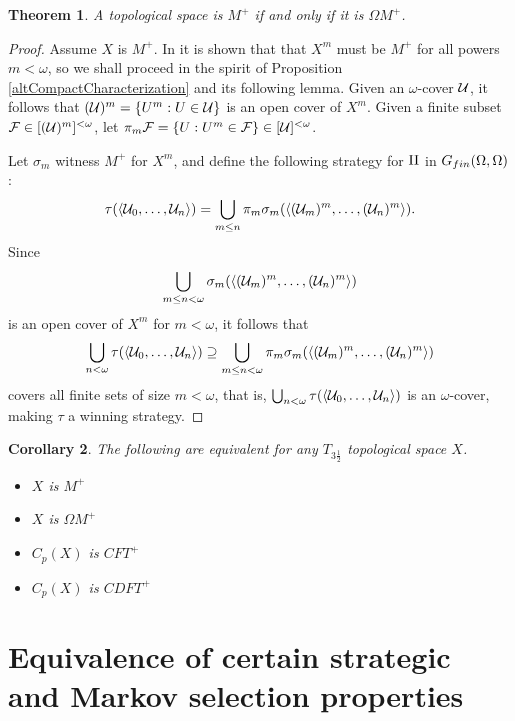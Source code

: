 \documentclass{amsart}
\theoremstyle{plain}
\newtheorem{theorem}{Theorem}
\newtheorem{corollary}[theorem]{Corollary}
\theoremstyle{definition}
\theoremstyle{remark}
\theoremstyle{plain}
\theoremstyle{definition}
\theoremstyle{remark}
\begin{document}
\begin{theorem}
  A topological space is \(M^+\) if and only if it is \(\Omega M^+\).
\end{theorem}

\begin{proof}
  Assume \(X\) is \(M^+\). In \cite[Proposition 5.1]{MR3383283} it is shown
  that that \(X^m\) must be \(M^+\) for all powers \(m<\omega\), so we shall
  proceed in the spirit of Proposition \ref{altCompactCharacterization}
  and its following lemma. Given an \(\omega\)-cover \(\mathcal{U}\),
  it follows that \((\mathcal{U})^m=\{U^m:U\in\mathcal{U}\}\) is an open cover of
  \(X^m\). Given a finite subset \(\mathcal{F}\in[(\mathcal{U})^m]^{<\omega}\),
  let \(\pi_m\mathcal{F}=\{U:U^m\in\mathcal{F}\}\in[\mathcal{U}]^{<\omega}\).

  Let \(\sigma_m\) witness \(M^+\) for \(X^m\), and define
  the following strategy for \(\mathrm{II}\) in \(G_{fin}(\Omega,\Omega)\):
  \[
    \tau(\langle\mathcal{U}_0,\dots,\mathcal{U}_n\rangle)
      =
    \bigcup_{m\leq n}
    \pi_m\sigma_m(\langle(\mathcal{U}_m)^m,\dots,(\mathcal{U}_n)^m\rangle)
  .\]
  Since
  \[
    \bigcup_{m\leq n<\omega}
    \sigma_m(\langle(\mathcal{U}_m)^m,\dots,(\mathcal{U}_n)^m\rangle)
  \]
  is an open cover of \(X^m\) for \(m<\omega\), it follows that
  \[
    \bigcup_{n<\omega}
    \tau(\langle\mathcal{U}_0,\dots,\mathcal{U}_n\rangle)
      \supseteq
    \bigcup_{m\leq n<\omega}
    \pi_m\sigma_m(\langle(\mathcal{U}_m)^m,\dots,(\mathcal{U}_n)^m\rangle)
  \]
  covers all finite sets of size \(m<\omega\), that is,
  \(
    \bigcup_{n<\omega}
    \tau(\langle\mathcal{U}_0,\dots,\mathcal{U}_n\rangle)
  \)
  is an \(\omega\)-cover, making \(\tau\) a winning strategy.
\end{proof}

\begin{corollary}
  The following are equivalent for any \(T_{3\frac{1}{2}}\)
  topological space \(X\).
    \begin{itemize}
      \item \(X\) is \(M^+\)
      \item \(X\) is \(\Omega M^+\)
      \item \(C_p(X)\) is \(CFT^+\)
      \item \(C_p(X)\) is \(CDFT^+\)
    \end{itemize}
\end{corollary}

\section{Equivalence of certain strategic and Markov selection properties}
\end{document}

